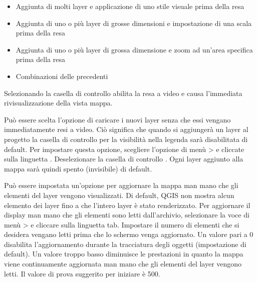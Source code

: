 \begin{itemize}
\item Aggiunta di molti layer e applicazione di uno stile visuale prima della
resa
\item Aggiunta di uno o più layer di grosse dimensioni e impostazione di una
scala prima della resa
\item Aggiunta di uno o più layer di grossa dimensione e zoom ad un'area specifica prima della resa
\item Combinazioni delle precedenti
\end{itemize}

Selezionando la casella di controllo  abilita la resa a
video e causa l'immediata rivisualizzazione della vista mappa.

\label{label_settinglayer}

Può essere scelta l'opzione di caricare i nuovi layer senza che essi vengano
immediatamente resi a video. Ciò significa che quando si aggiungerà un layer
al progetto la casella di controllo per la visibilità nella legenda sarà
disabilitata di default. Per impostare questa opzione, scegliere l'opzione di
menù  >  e cliccate sulla
linguetta . Deselezionare la casella di controllo . Ogni layer aggiunto alla mappa sarà quindi spento
(invisibile) di default.

%
%

\label{label_updatemap}

Può essere impostata un'opzione per aggiornare la mappa man mano che gli
elementi del layer vengono visualizzati. Di default, QGIS non mostra alcun elemento dei
layer fino a che l'intero layer è stato renderizzato. Per aggiornare il
display man mano che gli elementi sono letti dall'archivio, selezionare la
voce di menù  >  e cliccare sulla
linguetta  tab. Impostare il numero di elementi che si desidera
vengano letti prima che lo schermo venga aggiornato. Un valore pari a 0
disabilita l'aggiornamento durante la tracciatura degli oggetti (impostazione
di default). Un valore troppo basso diminuisce le prestazioni in quanto la
mappa viene continuamente aggiornata man mano che gli elementi del layer
vengono letti. Il valore di prova suggerito per iniziare è 500. 

